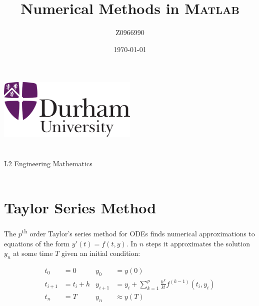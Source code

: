 \documentclass[a4paper,12pt,twocolumn]{article}
\author{Z0966990}
\title{Numerical Methods in \textsc{Matlab}}
\date{\today}
\begin{document}
    
\begin{titlepage}
    \centering
    \vspace*{\fill}
    \includegraphics[width=0.5\textwidth]{Durham.png}\\
    \vspace*{\fill}
    \LARGE\thetitle\\
    \large\theauthor\\
    \large L2 Engineering Mathematics\\
    \large\thedate\\
    \vspace*{\fill}
\end{titlepage}



\printnomenclature

\section{Taylor Series Method}

The $p$\textsuperscript{th} order Taylor's series method for ODEs finds
numerical approximations to equations of the form $y'(t) = f(t,y)$. In $n$ steps
it approximates the solution $y_n$ at some time $T$ given an initial condition:
\begin{footnotesize}
    \vspace{-0.5\baselineskip}
    \begin{equation} \label{eq:taylor-method}
        \begin{aligned}
            t_0 &= 0 &
            y_0 &= y(0) \\
            t_{i+1} &= t_i + h &
            y_{i+1} &= y_i + \sum_{k=1}^{p}\frac{h^k}{k!}f^{(k-1)}(t_i,y_i) \\
            t_n &= T &
            y_n &\approx y(T) 
        \end{aligned}
    \end{equation}
    \vspace{-1.5\baselineskip}
\end{footnotesize}
\end{document}
